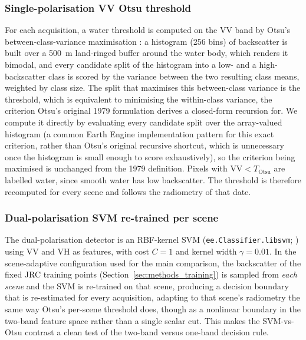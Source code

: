 \subsubsection{Single-polarisation VV Otsu threshold}
\label{sec:methods_otsu}

For each acquisition, a water threshold is computed on the VV band by Otsu's
between-class-variance maximisation \citep{Otsu1979}: a histogram (256 bins)
of backscatter is built over a 500~m land-ringed buffer around the water
body, which renders it bimodal, and every candidate split of the histogram
into a low- and a high-backscatter class is scored by the variance between
the two resulting class means, weighted by class size. The split that
maximises this between-class variance is the threshold, which is equivalent
to minimising the within-class variance, the criterion Otsu's original 1979
formulation derives a closed-form recursion for. We compute it directly by
evaluating every candidate split over the array-valued histogram (a common
Earth Engine implementation pattern for this exact criterion, rather than
Otsu's original recursive shortcut, which is unnecessary once the histogram
is small enough to score exhaustively), so the criterion being maximised is
unchanged from the 1979 definition. Pixels with $\text{VV} < T_{\text{Otsu}}$
are labelled water, since smooth water has low backscatter. The threshold is
therefore recomputed for every scene and follows the radiometry of that date.

\subsubsection{Dual-polarisation SVM re-trained per scene}
\label{sec:methods_svm}

The dual-polarisation detector is an RBF-kernel SVM
(\texttt{ee.Classifier.libsvm}; \citealp{ChangLin2011}) using VV and VH as
features, with cost $C=1$ and kernel width $\gamma=0.01$. In the scene-adaptive
configuration used for the main comparison, the backscatter of the fixed JRC
training points (Section~\ref{sec:methods_training}) is sampled from
\emph{each scene} and the SVM is re-trained on that scene, producing a
decision boundary that is re-estimated for every acquisition, adapting to
that scene's radiometry the same way Otsu's per-scene threshold does, though
as a nonlinear boundary in the two-band feature space rather than a single
scalar cut. This makes the SVM-vs-Otsu contrast a clean test of the two-band
versus one-band decision rule.


